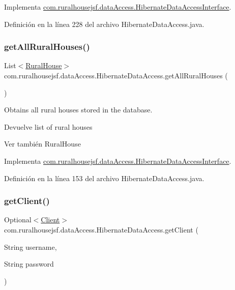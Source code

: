 Implementa \mbox{\hyperlink{a00148_a59446f9ebfa6acfa2315debdca84d360}{com.\+ruralhousejsf.\+data\+Access.\+Hibernate\+Data\+Access\+Interface}}.



Definición en la línea 228 del archivo Hibernate\+Data\+Access.\+java.

\mbox{\label{a00144_acb92be47dc680218ff3102addce8ae8f}} 
\subsubsection{\texorpdfstring{getAllRuralHouses()}{getAllRuralHouses()}}
{\footnotesize\ttfamily List$<$\mbox{\hyperlink{a00188}{Rural\+House}}$>$ com.\+ruralhousejsf.\+data\+Access.\+Hibernate\+Data\+Access.\+get\+All\+Rural\+Houses (\begin{DoxyParamCaption}{ }\end{DoxyParamCaption})}



Obtains all rural houses stored in the database. 

\begin{DoxyReturn}{Devuelve}
list of rural houses
\end{DoxyReturn}
\begin{DoxySeeAlso}{Ver también}
Rural\+House 
\end{DoxySeeAlso}


Implementa \mbox{\hyperlink{a00148_a1cdfce6d8d91e481887b364000fbf6d0}{com.\+ruralhousejsf.\+data\+Access.\+Hibernate\+Data\+Access\+Interface}}.



Definición en la línea 153 del archivo Hibernate\+Data\+Access.\+java.

\mbox{\label{a00144_a6df6a0502595b73be0f6d238743eeda5}} 
\subsubsection{\texorpdfstring{getClient()}{getClient()}}
{\footnotesize\ttfamily Optional$<$\mbox{\hyperlink{a00164}{Client}}$>$ com.\+ruralhousejsf.\+data\+Access.\+Hibernate\+Data\+Access.\+get\+Client (\begin{DoxyParamCaption}\item[{String}]{username,  }\item[{String}]{password }\end{DoxyParamCaption})}



